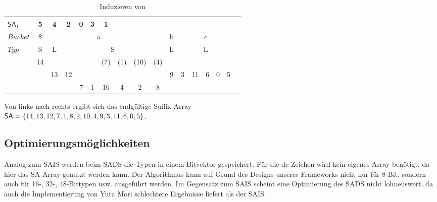 \begin{table}[H]
\centering
\begin{adjustbox}{width=1\textwidth}
  \begin{tabular}{ | l | c | c | c | c | c | c | c | c | c | c | c | c | c | c | c | c | }
    \hline
     $\mathsf{SA}_1$ & 5 & 4 & 2 & 0 & 3 & 1 & & & & & & & & & \\ \hline
   $Bucket$ &\$ & \multicolumn{7}{c}{a} &   & \multicolumn{1}{c}{b} &   & \multicolumn{3}{c}{c} & \\ \hline
      $Typ$ & S & \multicolumn{1}{c}{L} &   & \multicolumn{5}{c}{S} &   & \multicolumn{1}{c}{L} &    & \multicolumn{3}{c}{L} &\\ \hline
            & 14 & & & & & (7) & (1) & (10) & (4) & & & & & & \\ \hline
            & & 13 & 12 & & & & & & & 9 & 3 & 11 & 6 & 0 & 5 \\ \hline
            & & & & 7 & 1 & 10 & 4 & 2 & 8 & & & & & & \\
    \hline
  \end{tabular}
  \end{adjustbox}
  \caption{Induzieren von \sa}
\end{table}
\bigskip
\noindent Von links nach rechts ergibt sich das endgültige Suffix-Array \\
$\sa = \{14, 13, 12, 7, 1, 8, 2, 10, 4, 9, 3, 11, 6, 0, 5\}$.

\subsection{Optimierungsmöglichkeiten}
Analog zum SAIS werden beim SADS die Typen in einem Bitvektor gespeichert. Für die dc-Zeichen wird kein eigenes Array benötigt, da hier das SA-Array genutzt werden kann. Der Algorithmus kann auf Grund des Designs unseres Frameworks nicht nur für 8-Bit, sondern auch für 16-, 32-, 48-Bittypen usw. ausgeführt werden. Im Gegensatz zum SAIS scheint eine Optimierung des SADS nicht lohnenswert, da auch die Implementierung von Yuta Mori schlechtere Ergebnisse liefert als der SAIS.
 \newpage





























